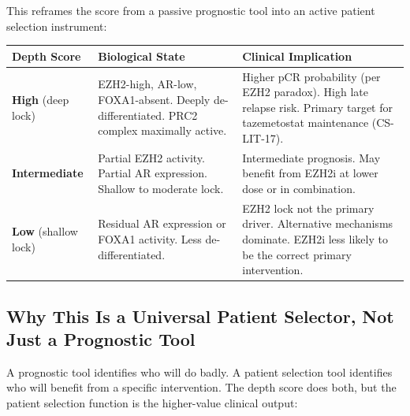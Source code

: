 \documentclass[12pt, a4paper]{article}
\begin{document}
This reframes the score from a passive prognostic
tool into an active patient selection instrument:

\begin{center}
\begin{tabular}{p{3.5cm}p{4.5cm}p{4.5cm}}
\toprule
\textbf{Depth Score} &
\textbf{Biological State} &
\textbf{Clinical Implication} \\
\midrule
\textbf{High}
(deep lock) &
EZH2-high, AR-low, FOXA1-absent.
Deeply de-differentiated. PRC2
complex maximally active. &
Higher pCR probability (per EZH2
paradox). High late relapse risk.
Primary target for tazemetostat
maintenance (CS-LIT-17). \\[0.5em]
\textbf{Intermediate} &
Partial EZH2 activity. Partial
AR expression. Shallow to
moderate lock. &
Intermediate prognosis. May
benefit from EZH2i at lower dose
or in combination. \\[0.5em]
\textbf{Low}
(shallow lock) &
Residual AR expression or FOXA1
activity. Less de-differentiated. &
EZH2 lock not the primary driver.
Alternative mechanisms dominate.
EZH2i less likely to be the
correct primary intervention. \\
\bottomrule
\end{tabular}
\end{center}

\subsection{Why This Is a Universal Patient
Selector, Not Just a Prognostic Tool}

A prognostic tool identifies who will do badly.
A patient selection tool identifies who will
benefit from a specific intervention. The depth
score does both, but the patient selection
function is the higher-value clinical output:
\end{document}
